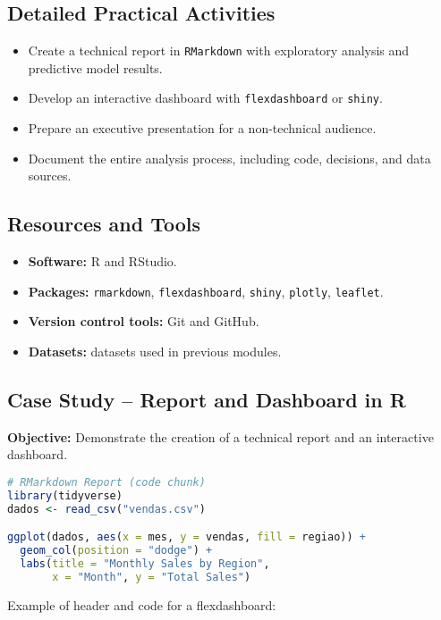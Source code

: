 \subsection{\textcolor{subsectionblue}{Detailed Practical Activities}}
\begin{itemize}
  \item Create a technical report in \texttt{RMarkdown} with exploratory analysis and predictive model results.
  \item Develop an interactive dashboard with \texttt{flexdashboard} or \texttt{shiny}.
  \item Prepare an executive presentation for a non-technical audience.
  \item Document the entire analysis process, including code, decisions, and data sources.
\end{itemize}

\subsection{\textcolor{subsectionblue}{Resources and Tools}}
\begin{itemize}
  \item \textbf{Software:} R and RStudio.
  \item \textbf{Packages:} \texttt{rmarkdown}, \texttt{flexdashboard}, \texttt{shiny}, \texttt{plotly}, \texttt{leaflet}.
  \item \textbf{Version control tools:} Git and GitHub.
  \item \textbf{Datasets:} datasets used in previous modules.
\end{itemize}

\subsection{\textcolor{subsectionblue}{Case Study – Report and Dashboard in R}}
\textbf{Objective:} Demonstrate the creation of a technical report and an interactive dashboard.

\begin{lstlisting}[language=R]
# RMarkdown Report (code chunk)
library(tidyverse)
dados <- read_csv("vendas.csv")

ggplot(dados, aes(x = mes, y = vendas, fill = regiao)) +
  geom_col(position = "dodge") +
  labs(title = "Monthly Sales by Region",
       x = "Month", y = "Total Sales")
\end{lstlisting}

Example of header and code for a flexdashboard:

